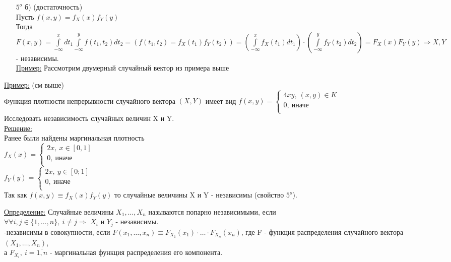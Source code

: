\begin{enumerate}
\item[$5^o$ б)] \fbox{$\Leftarrow$} (достаточность) \\
Пусть $f(x,y) = f_X(x) f_Y(y)$ \\
Тогда \\
$\displaystyle  F(x,y) = \int\limits_{-\infty}^{x} dt_1 \int\limits_{-\infty}^{y} f(t_1, t_2) dt_2 = \left( f(t_1, t_2) = f_X(t_1) f_Y(t_2) \right) = \left( \int\limits_{-\infty}^{x} f_X(t_1) dt_1 \right) \cdot \left( \int\limits_{-\infty}^{y} f_Y(t_2)dt_2 \right) = F_X(x) F_Y(y) \Rightarrow X,Y$ - независимы. \\
\underline{Пример:} Рассмотрим двумерный случайный вектор из примера выше \\
\end{enumerate}


\underline{Пример:} (см выше) \\
Функция плотности непрерывности случайного вектора $(X,Y)$ имеет вид $f(x,y) = 
\begin{cases}
	4xy, \ (x,y) \in K \\
	0, \ \text{иначе} \\
\end{cases}$ \\
Исследовать независимость случайных величин X и Y.\\
\underline{Решение:} \\
Ранее были найдены маргинальная плотность \\
$f_X(x) = 
\begin{cases}
	2x, \ x \in [0,1] \\
	0, \ \text{иначе} \\
\end{cases}$ \\
$f_Y(y) = 
\begin{cases} 
	2x, \ y \in [0;1] \\
	0, \ \text{иначе} \\
\end{cases}$ \\
Так как $f(x,y) \equiv f_X(x) f_Y(y)$ то случайные величины X и Y - независимы (свойство $5^o$).


\underline{Определение:} Случайные величины $X_1, \ldots, X_n$ называются попарно независимыми, если \\
$\forall \forall i,j \in \{1, \ldots, n\}, \ i \neq j \Rightarrow$ $X_i$ и $Y_j$ - независимы. \\
-независимы в совокупности, если $F(x_1, \ldots, x_n) \equiv F_{X_1}(x_1) \cdot \ldots \cdot F_{X_n}(x_n)$, где F - функция распределения случайного вектора $(X_1, \ldots, X_n)$, \\
а $F_{X_i}, \ i = \overline{1,n}$ - маргинальная функция распределения его компонента. \\


